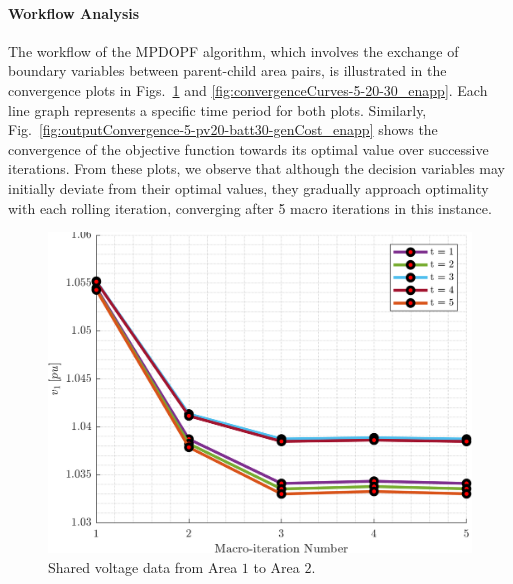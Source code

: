 \paragraph{Workflow Analysis}
The workflow of the MPDOPF algorithm, which involves the exchange of boundary variables between parent-child area pairs, is illustrated in the convergence plots in Figs.~\ref{fig:voltage_1_2_enapp} and \ref{fig:convergenceCurves-5-20-30_enapp}. Each line graph represents a specific time period for both plots. Similarly, Fig.~\ref{fig:outputConvergence-5-pv20-batt30-genCost_enapp} shows the convergence of the objective function towards its optimal value over successive iterations. From these plots, we observe that although the decision variables may initially deviate from their optimal values, they gradually approach optimality with each rolling iteration, converging after 5 macro iterations in this instance.

\begin{figure}[t]
    \centering
    \includegraphics[width=0.8\columnwidth]{figures/T5-pv20-batt30-genCost/dopf/convergenceCurves/BoundaryVoltage_vs_t_vs_macroItr_T_5_Areas_1_2_genCost_pv_20_batt_30_crop.png}
    \caption{Shared voltage data from Area $1$ to Area $2$.}
    \label{fig:voltage_1_2_enapp}
    \vspace{-4mm}
\end{figure}

